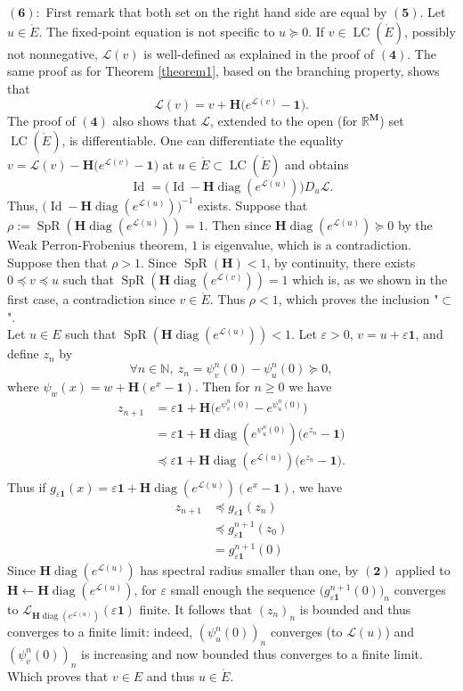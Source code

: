 \documentclass[reqno,final,11pt]{amsart}
\theoremstyle{plain}
\theoremstyle{definition}
\theoremstyle{remark}
\newcommand{\R}{\mathds{R}}
\newcommand{\N}{\mathds{N}}
\newcommand{\M}{\bm{M}}
\renewcommand{\L}{\bm{\mathscr{L}}}
\newcommand{\ones}{\bm{1}}
\renewcommand{\H}{\bm{H}}
\newcommand{\CEt}{\ce}
\DeclareMathOperator{\diag}{diag}
\DeclareMathOperator{\spr}{SpR}
\DeclareMathOperator{\Id}{Id}
\DeclareMathOperator{\ce}{LC}
\begin{document}
$\bm{(6):}$ First remark that both set on the right hand side are equal by $\bm{(5)}$. Let $u\in \mathring{E}$. The fixed-point equation is not specific to $u\succeq 0$. If $v\in \CEt(\mathring{E})$, possibly not nonnegative, $\L(v)$ is well-defined as explained in the proof of $\bm{(4)}$. The same proof as for Theorem \ref{theorem1}, based on the branching property, shows that \[ \L(v) = v + \H\big( e^{\L(v)}-\ones\big).\] The proof of $\bm{(4)}$ also shows that $\L$, extended to the open (for $\R^{\M}$) set $\CEt(\mathring{E})$, is differentiable. One can differentiate the equality $v = \L(v) - \H\big( e^{\L(v)}-\ones\big)$ at $u\in \mathring{E} \subset \CEt(\mathring{E})$ and obtains 
	\begin{equation}
		\Id = \big(\Id - \H\diag(e^{\L(u)})\big) D_u\L. 
	\end{equation}
	Thus, $\big(\Id - \H\diag(e^{\L(u)})\big)^{-1}$ exists. Suppose that $\rho := \spr(\H\diag(e^{\L(u)}))= 1$. Then since $\H\diag(e^{\L(u)}) \succeq 0$ by the Weak Perron-Frobenius theorem, $1$ is eigenvalue, which is a contradiction. Suppose then that $\rho >1$. Since $\spr(\H)<1$, by continuity, there exists $0 \preceq  v\preceq u$ such that $\spr(\H\diag(e^{\L(v)}))=1$ which is, as we shown in the first case, a contradiction since $v\in \mathring{E}$. Thus $\rho <1$, which proves the inclusion "$ \subset$".\\
	Let $u\in E$ such that $\spr(\H \diag(e^{\L(u)}))<1$. Let $\varepsilon >0$, $v = u+\varepsilon \ones$, and define $z_n$ by \[\forall n\in\N, \ z_n = \psi^n_v(0)-\psi^n_u(0) \succeq 0,\] where $\psi_w(x) = w+\H(e^x-\ones)$. Then for $n\geq 0$ we have 
	\begin{align*} 
		z_{n+1} & = \varepsilon \ones + \H\big( e^{\psi^n_v(0)} - e^{\psi^n_u(0)}\big) \\
		& = \varepsilon \ones + \H\diag(e^{\psi^n_u(0)}) \big(e^{z_n} - \ones\big) \\
		& \preceq \varepsilon \ones + \H\diag(e^{\L(u)}) \big(e^{z_n} - \ones\big). \\
	\end{align*}
	Thus if $g_{\varepsilon\ones}(x) = \varepsilon\ones + \H\diag(e^{\L(u)}) (e^{x} - \ones)$, we have
	\begin{align*}
		z_{n+1} & \preceq g_{\varepsilon\ones}(z_n) \\
		& \preceq g_{\varepsilon\ones}^{n+1}(z_0)\\
		& = g_{\varepsilon\ones}^{n+1}(0)
	\end{align*}
	Since $\H\diag(e^{\L(u)})$ has spectral radius smaller than one, by $\bm{(2)}$ applied to $\H \leftarrow\H\diag(e^{\L(u)})$, for $\varepsilon$ small enough the sequence $\big(g_{\varepsilon\ones}^{n+1}(0)\big)_n$ converges to $\L_{\H\diag(e^{\L(u)})}(\varepsilon\ones)$ finite. It follows that $(z_n)_n$ is bounded and thus converges to a finite limit: indeed, $(\psi^n_u(0))_n$ converges (to $\L(u)$) and $(\psi_v^n(0))_n$ is increasing and now bounded thus converges to a finite limit. Which proves that $v \in E$ and thus $u\in \mathring{E}$.
	
\end{document}
